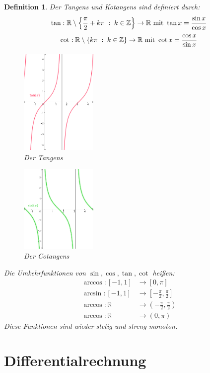 \documentclass[a4paper,titlepage,oneside]{article}
\def\Z{\ensuremath{\mathbb{Z}} }
\def\R{\ensuremath{\mathbb{R}} }
\def\sp{\hspace{0,1cm}}
\newcommand{\menge}[2]{\ensuremath{\left\{#1\sp : \sp #2\right\}}}
\theoremstyle{thmstyle}
\newtheorem{defi}[satz]{Definition}
\theoremstyle{subthmstyle}
\begin{document}
\begin{defi}
Der Tangens und Kotangens sind definiert durch:
\[\tan: \R\setminus\menge{\frac{\pi}{2} + k \pi}{k \in \Z} \to \R  \text{ mit } \tan x = \frac{\sin x}{\cos x}\]
\[\cot: \R\setminus\menge{k \pi}{k \in \Z} \to \R  \text{ mit } \cot x = \frac{\cos x}{\sin x}\]
\begin{figure}[ht]\centering
 \includegraphics[width=0.33\textwidth]{images/tangens.png}
\caption{Der Tangens}
\end{figure}
\begin{figure}[ht]\centering
 \includegraphics[width=0.33\textwidth]{images/cotangens.png}
\caption{Der Cotangens}
\end{figure}
Die Umkehrfunktionen von $\sin, \cos, \tan, \cot$ heißen:
\begin{align*}\arccos: [-1,1] &\to [0,\pi]\\
\arcsin: [-1,1] &\to [-\frac{\pi}{2},\frac{\pi}{2}]\\
\arccos: \R &\to (-\frac{\pi}{2}, \frac{\pi}{2})\\
\arccos: \R &\to (0,\pi)\end{align*}
Diese Funktionen sind wieder stetig und streng monoton.
\end{defi}


\section{Differentialrechnung}
\end{document}
